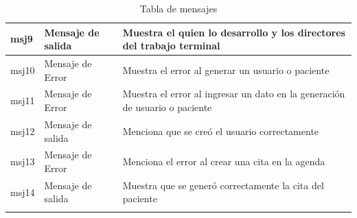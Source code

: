 \documentclass[10pt]{article}
\begin{document}
\begin{longtable}{|p{5.0cm}|p{3.5cm}|p{6.5cm}|}
msj9 & Mensaje de salida & Muestra el quien lo desarrollo y los directores del trabajo terminal \\
\hline

msj10 & Mensaje de Error & Muestra el error al generar un usuario o paciente \\
\hline

msj11 & Mensaje de Error &  Muestra el error al ingresar un dato en la generación de usuario o paciente\\
\hline

msj12 & Mensaje de salida & Menciona que se creó el usuario correctamente \\
\hline

msj13 & Mensaje de Error & Menciona el error al crear una cita en la agenda \\
\hline
msj14 & Mensaje de salida & Muestra que se generó correctamente la cita del paciente \\
\hline
\caption{Tabla de mensajes}
\label{tabla1}
\end{longtable}

\newpage
\end{document}
